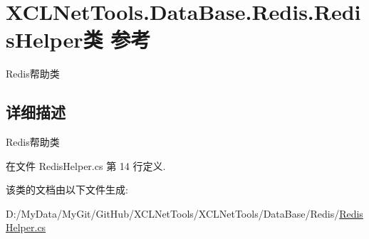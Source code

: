 \hypertarget{class_x_c_l_net_tools_1_1_data_base_1_1_redis_1_1_redis_helper}{\section{X\-C\-L\-Net\-Tools.\-Data\-Base.\-Redis.\-Redis\-Helper类 参考}
\label{class_x_c_l_net_tools_1_1_data_base_1_1_redis_1_1_redis_helper}
}


Redis帮助类  




\subsection{详细描述}
Redis帮助类 



在文件 Redis\-Helper.\-cs 第 14 行定义.



该类的文档由以下文件生成\-:\begin{DoxyCompactItemize}
\item 
D\-:/\-My\-Data/\-My\-Git/\-Git\-Hub/\-X\-C\-L\-Net\-Tools/\-X\-C\-L\-Net\-Tools/\-Data\-Base/\-Redis/\hyperlink{_redis_helper_8cs}{Redis\-Helper.\-cs}\end{DoxyCompactItemize}
